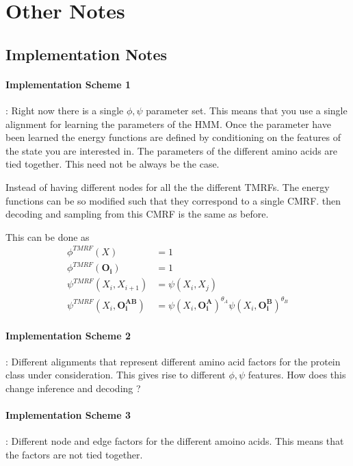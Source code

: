 \documentclass{article}
\begin{document}



\appendix

\section{Other Notes}

\subsection{Implementation Notes}

\paragraph{Implementation Scheme 1} : Right now there is a single $\phi,\psi$ parameter set. This means that you use a single alignment for learning the parameters of the HMM. Once the parameter have been learned the energy functions are defined by conditioning on the features of the state you are interested in. The parameters of the different amino acids are tied together. This need not be always be the case. 

Instead of having different nodes for all the the different TMRFs. The energy functions can be so modified such that they correspond to a single CMRF. then decoding and sampling from this CMRF is the same as before. 

This can be done as 
\begin{align*}
\phi^{TMRF}(X) &= 1 \\
\phi^{TMRF}(\mathbf{O_i}) &= 1 \\
\psi^{TMRF}(X_i,X_{i+1}) &= \psi(X_i,X_j)\\
\psi^{TMRF}(X_i,\mathbf{O_i^{AB}}) &= \psi(X_i,\mathbf{O_i^A})^{\theta_A}\psi(X_i,\mathbf{O_i^B})^{\theta_B}
\end{align*}


\paragraph{Implementation Scheme 2} : Different alignments that represent different amino acid factors for the protein class under consideration. This gives rise to different $\phi,\psi$ features. How does this change inference and decoding ?

\paragraph{Implementation Scheme 3} : Different node and edge factors for the different amoino acids. This means that the factors are not tied together. 
\end{document}
